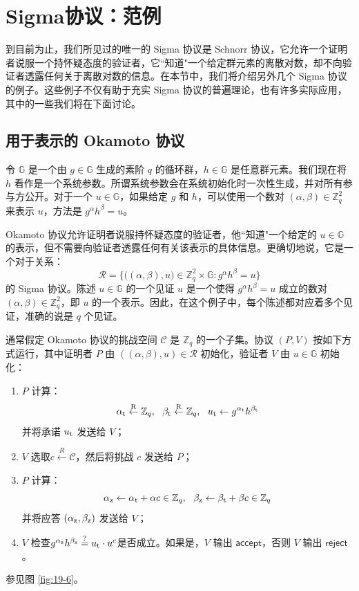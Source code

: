 \section{Sigma协议：范例}

到目前为止，我们所见过的唯一的 Sigma 协议是 Schnorr 协议，它允许一个证明者说服一个持怀疑态度的验证者，它``知道"一个给定群元素的离散对数，却不向验证者透露任何关于离散对数的信息。在本节中，我们将介绍另外几个 Sigma 协议的例子。这些例子不仅有助于充实 Sigma 协议的普遍理论，也有许多实际应用，其中的一些我们将在下面讨论。

\subsection{用于表示的 Okamoto 协议}\label{subsec:19-5-1}

令 $\mathbb{G}$ 是一个由 $g\in\mathbb{G}$ 生成的素阶 $q$ 的循环群，$h\in\mathbb{G}$ 是任意群元素。我们现在将 $h$ 看作是一个系统参数。所谓系统参数会在系统初始化时一次性生成，并对所有参与方公开。对于一个 $u\in\mathbb{G}$，如果给定 $g$ 和 $h$，可以使用一个数对 $(\alpha,\beta)\in\mathbb{Z}_q^2$ 来表示 $u$，方法是 $g^\alpha h^\beta=u$。

Okamoto 协议允许证明者说服持怀疑态度的验证者，他``知道"一个给定的 $u\in\mathbb{G}$ 的表示，但不需要向验证者透露任何有关该表示的具体信息。更确切地说，它是一个对于关系：
\begin{equation}\label{eq:19-11}
	\mathcal{R}=\bigg\lbrace
	\big((\alpha,\beta),u\big)\in\mathbb{Z}_q^2\times\mathbb{G}:g^\alpha h^\beta=u
	\bigg\rbrace
\end{equation}
的 Sigma 协议。陈述 $u\in\mathbb{G}$ 的一个见证 $u$ 是一个使得 $g^\alpha h^\beta=u$ 成立的数对 $(\alpha,\beta)\in\mathbb{Z}_q^2$，即 $u$ 的一个表示。因此，在这个例子中，每个陈述都对应着多个见证，准确的说是 $q$ 个见证。

通常假定 Okamoto 协议的挑战空间 $\mathcal{C}$ 是 $\mathbb{Z}_q$ 的一个子集。协议 $(P,V)$ 按如下方式运行，其中证明者 $P$ 由 $((\alpha,\beta),u)\in\mathcal{R}$ 初始化，验证者 $V$ 由 $u\in\mathbb{G}$ 初始化：
\begin{enumerate}
	\item $P$ 计算：
	$$
    \alpha_{\rm t}\overset{\rm R}\leftarrow\mathbb{Z}_q,~~
    \beta_{\rm t}\overset{\rm R}\leftarrow\mathbb{Z}_q,~~
    u_{\rm t}\leftarrow g^{\alpha_{\rm t}}h^{\beta_{\rm t}}
    $$
    并将承诺 $u_{\rm t}$ 发送给 $V$；
	\item $V$ 选取$c\overset{R}\leftarrow\mathcal{C}$，然后将挑战 $c$ 发送给 $P$；
	\item $P$ 计算：
	$$
    \alpha_{\rm z}\leftarrow\alpha_{\rm t}+\alpha c\in\mathbb{Z}_q,~~
    \beta_{\rm z}\leftarrow\beta_{\rm t}+\beta c\in\mathbb{Z}_q
    $$
    并将应答 $(\alpha_{\rm z}, \beta_{\rm z})$ 发送给 $V$；
	\item $V$ 检查$g^{\alpha_{\rm z}}h^{\beta_{\rm z}}\overset{?}=u_{\rm t}\cdot u^c$是否成立。如果是，$V$ 输出 $\mathsf{accept}$，否则 $V$ 输出 $\mathsf{reject}$。
\end{enumerate}
参见图 \ref{fig:19-6}。

